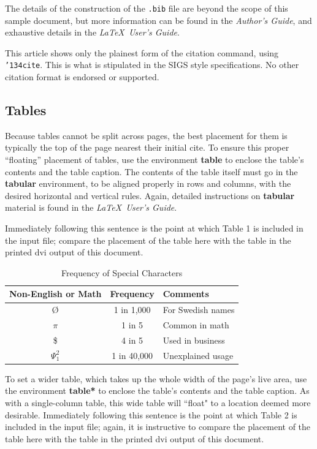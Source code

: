 \documentclass{sig-alternate-05-2015}
\begin{document}
The details of the construction of the \texttt{.bib} file
are beyond the scope of this sample document, but more
information can be found in the \textit{Author's Guide},
and exhaustive details in the \textit{\LaTeX\ User's
Guide}\cite{Lamport:LaTeX}.

This article shows only the plainest form
of the citation command, using \texttt{{\char'134}cite}.
This is what is stipulated in the SIGS style specifications.
No other citation format is endorsed or supported.

\subsection{Tables}
Because tables cannot be split across pages, the best
placement for them is typically the top of the page
nearest their initial cite.  To
ensure this proper ``floating'' placement of tables, use the
environment \textbf{table} to enclose the table's contents and
the table caption.  The contents of the table itself must go
in the \textbf{tabular} environment, to
be aligned properly in rows and columns, with the desired
horizontal and vertical rules.  Again, detailed instructions
on \textbf{tabular} material
is found in the \textit{\LaTeX\ User's Guide}.

Immediately following this sentence is the point at which
Table 1 is included in the input file; compare the
placement of the table here with the table in the printed
dvi output of this document.

\begin{table}
\centering
\caption{Frequency of Special Characters}
\begin{tabular}{|c|c|l|} \hline
Non-English or Math&Frequency&Comments\\ \hline
\O & 1 in 1,000& For Swedish names\\ \hline
$\pi$ & 1 in 5& Common in math\\ \hline
\$ & 4 in 5 & Used in business\\ \hline
$\Psi^2_1$ & 1 in 40,000& Unexplained usage\\
\hline\end{tabular}
\end{table}

To set a wider table, which takes up the whole width of
the page's live area, use the environment
\textbf{table*} to enclose the table's contents and
the table caption.  As with a single-column table, this wide
table will ``float" to a location deemed more desirable.
Immediately following this sentence is the point at which
Table 2 is included in the input file; again, it is
instructive to compare the placement of the
table here with the table in the printed dvi
output of this document.
\end{document}
